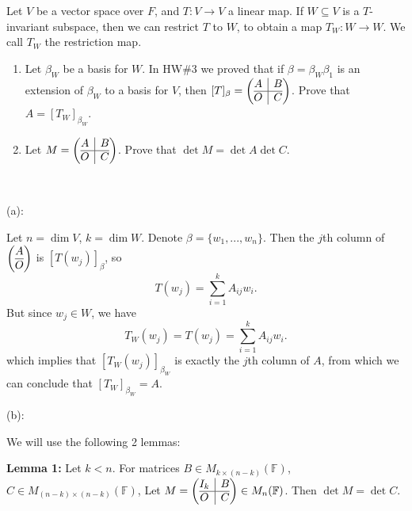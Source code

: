 \documentclass{eh-homework}
\begin{document}
    \begin{question}{6}
    Let $V$ be a vector space over $F$, and $T : V \to V$ a linear map. If $W \subseteq V$ is a $T$-invariant subspace, then we can restrict \(T\) to \(W\), to obtain a map \(T_W : W \to W\). We call \(T_W\) the restriction map.
    
    \begin{enumerate}[label=(\alph*)]
        \item Let \(\beta _W\) be a basis for \(W\). In HW\#3 we proved that if \(\beta = \beta _W \beta _1\) is an extension of \(\beta_W\) to a basis for \(V\), then \([T]_\beta = \left( \begin{array}{@{}c|c@{}}
            A & B \\
            \hline
            O & C \\
        \end{array}\right)\). Prove that \(A = [T_W]_{\beta_W}\).

        \item Let \(M = \left(\begin{array}{@{}c|c@{}}
            A & B \\
            \hline
            O & C \\
        \end{array}\right)\). Prove that \(\det M = \det A \det C\).
    \end{enumerate}
    \tcblower
    \ 

    (a):

    Let \(n = \dim V\), \(k = \dim W\). Denote \(\beta = \{ w_1, ..., w_n \}\). Then the \(j\)th column of \(\left( \begin{array}{@{}c@{}}
        A \\
        \hline
        O \\
    \end{array} \right)\) is \([T(w_j)]_\beta\), so
    \[
        T(w_j) = \sum_{i=1}^{k} A_{ij} w_i.
    \]
    But since \(w_j \in W\), we have
    \[
        T_W(w_j) = T(w_j) = \sum_{i=1}^{k} A_{ij} w_i.
    \]
    which implies that \([T_W(w_j)]_{\beta_W}\) is exactly the \(j\)th column of \(A\), from which we can conclude that \([T_W]_{\beta_W} = A\).

    \medskip

    (b):

    We will use the following 2 lemmas:

    \textbf{Lemma 1:} Let \(k < n\). For matrices \(B \in M_{k\times (n-k)}(\mathbb{F})\), \(C \in M_{(n-k)\times (n-k)}(\mathbb{F})\), Let \(M = \left( \begin{array}{@{}c|c@{}}
        I_k & B \\
        \hline
        O & C
    \end{array} \right) \in M_n(\mathbb{F})\). Then \(\det M = \det C\).


\end{question}
\end{document}
